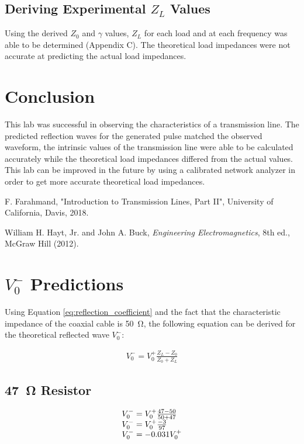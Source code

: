 \documentclass[conference]{IEEEtran}
\begin{document}
\subsection{Deriving Experimental $Z_L$ Values}
Using the derived $Z_0$ and $\gamma$ values, $Z_L$ for each load and at each
frequency was able to be determined (Appendix C). The theoretical load
impedances were not accurate at predicting the actual load impedances.

\section{Conclusion}

This lab was successful in observing the characteristics of a transmission line.
The predicted reflection waves for the generated pulse matched the observed
waveform, the intrinsic values of the transmission line were able to be
calculated accurately while the theoretical load impedances differed from the
actual values. This lab can be improved in the future by using a calibrated
network analyzer in order to get more accurate theoretical load impedances.

\begin{thebibliography}{99}

  F. Farahmand, "Introduction to Transmission Lines, Part II", University of California, Davis, 2018.

  William H. Hayt, Jr. and John A. Buck, \textit{Engineering Electromagnetics}, 8th ed., McGraw Hill (2012).

\end{thebibliography}

\appendices

\section{$V_0^-$ Predictions}
Using Equation \ref{eq:reflection_coefficient} and the fact that the
characteristic impedance of the coaxial cable is \SI{50}{\ohm}, the following equation can be
derived for the theoretical reflected wave $V_0^-$:

\[
  \begin{array}{ll}
    V_0^- = V_0^+ \frac{Z_L - Z_0}{Z_0 + Z_L}
  \end{array}
\]

\subsection{\SI{47}{\ohm} Resistor}
\begin{equation}{\label{eq:v_reflected_47_ohms}}
  \begin{array}{ll}
    V_0^- = V_0^+ \frac{47 - 50}{50 + 47} \\
    V_0^- = V_0^+ \frac{-3}{97} \\
    V_0^- = -0.031 V_0^+ \\
  \end{array}
\end{equation}
\end{document}
